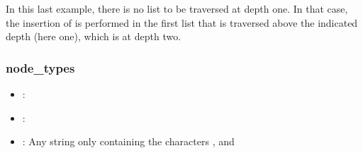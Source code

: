 \documentclass[a4paper,10pt,english]{sphinxmanual}
\begin{document}
\begin{sphinxVerbatim}[commandchars=\\\{\},numbers=left,firstnumber=1,stepnumber=1]
      \PYG{p}{[} \PYG{p}{]}  
    
\end{sphinxVerbatim}

\sphinxAtStartPar
In this last example, there is no list to be traversed at depth one. In that case, the insertion of  is performed in the first list that is traversed above the indicated \sphinxhyphen{}depth (here one), which is at depth two.


\subsubsection{node\_types}
\label{\detokenize{README:node-types}}\begin{itemize}
\item {}
\sphinxAtStartPar
{}: 

\item {}
\sphinxAtStartPar
{}: 

\item {}
\sphinxAtStartPar
{}: Any string only containing the characters ,  and 

\end{itemize}
\end{document}
